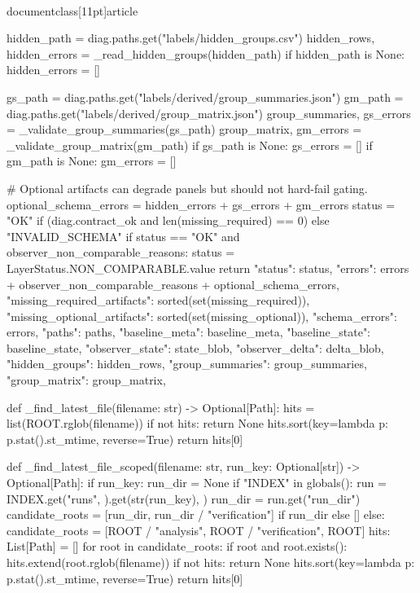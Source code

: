 \\documentclass[11pt]{article}
\begin{document}
\begin{CodeBlock}
{    hidden_path = diag.paths.get("labels/hidden_groups.csv")
    hidden_rows, hidden_errors = _read_hidden_groups(hidden_path)
    if hidden_path is None:
        hidden_errors = []

    gs_path = diag.paths.get("labels/derived/group_summaries.json")
    gm_path = diag.paths.get("labels/derived/group_matrix.json")
    group_summaries, gs_errors = _validate_group_summaries(gs_path)
    group_matrix, gm_errors = _validate_group_matrix(gm_path)
    if gs_path is None:
        gs_errors = []
    if gm_path is None:
        gm_errors = []

    # Optional artifacts can degrade panels but should not hard-fail gating.
    optional_schema_errors = hidden_errors + gs_errors + gm_errors
    status = "OK" if (diag.contract_ok and len(missing_required) == 0) else "INVALID_SCHEMA"
    if status == "OK" and observer_non_comparable_reasons:
        status = LayerStatus.NON_COMPARABLE.value
    return {
        "status": status,
        "errors": errors + observer_non_comparable_reasons + optional_schema_errors,
        "missing_required_artifacts": sorted(set(missing_required)),
        "missing_optional_artifacts": sorted(set(missing_optional)),
        "schema_errors": errors,
        "paths": paths,
        "baseline_meta": baseline_meta,
        "baseline_state": baseline_state,
        "observer_state": state_blob,
        "observer_delta": delta_blob,
        "hidden_groups": hidden_rows,
        "group_summaries": group_summaries,
        "group_matrix": group_matrix,
    }


def _find_latest_file(filename: str) -> Optional[Path]:
    hits = list(ROOT.rglob(filename))
    if not hits:
        return None
    hits.sort(key=lambda p: p.stat().st_mtime, reverse=True)
    return hits[0]


def _find_latest_file_scoped(filename: str, run_key: Optional[str]) -> Optional[Path]:
    if run_key:
        run_dir = None
        if "INDEX" in globals():
            run = INDEX.get("runs", {}).get(str(run_key), {})
            run_dir = run.get("run_dir")
        candidate_roots = [run_dir, run_dir / "verification"] if run_dir else []
    else:
        candidate_roots = [ROOT / "analysis", ROOT / "verification", ROOT]
    hits: List[Path] = []
    for root in candidate_roots:
        if root and root.exists():
            hits.extend(root.rglob(filename))
    if not hits:
        return None
    hits.sort(key=lambda p: p.stat().st_mtime, reverse=True)
    return hits[0]


}
\end{CodeBlock}
\end{document}
